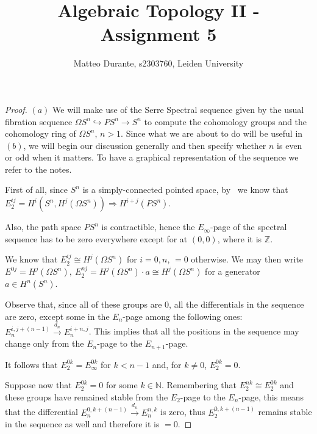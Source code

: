 \documentclass{article}
\newcommand{\numberset}{\mathbb}
\newcommand{\N}{\numberset{N}}
\newcommand{\Z}{\numberset{Z}}
\newcommand{\exercise}[1]{\noindent {\bf Exercise #1}}
\begin{document}
\title{Algebraic Topology II - Assignment 5}

\author{Matteo Durante, s2303760, Leiden University}

\maketitle

\exercise{2}

\begin{proof}
    $(a)$ We will make use of the Serre Spectral sequence given by the usual
    fibration sequence $\Omega S^n\hookrightarrow PS^n\rightarrow S^n$ to
    compute the cohomology groups and the cohomology ring of $\Omega S^n$,
    $n>1$. Since what we are about to do will be useful in $(b)$, we will begin
    our discussion generally and then specify whether $n$ is even or odd when it
    matters. To have a graphical representation of the sequence we refer to the
    notes.

    First of all, since $S^n$ is a simply-connected pointed space, by~\cite[thm.
    9.5]{HM19} we know that $E^{ij}_2=H^i(S^n,H^j(\Omega S^n))\Rightarrow
    H^{i+j}(PS^n)$.

    Also, the path space $PS^n$ is contractible, hence the $E_\infty$-page of
    the spectral sequence has to be zero everywhere except for at $(0,0)$, where
    it is $\Z$.

    We know that $E^{ij}_2\cong H^j(\Omega S^n)$ for $i=0,n$, $=0$ otherwise. We
    may then write $E^{0j}=H^j(\Omega S^n),\ E^{nj}_2=H^j(\Omega S^n)\cdot
    a\cong H^j(\Omega S^n)$ for a generator $a\in H^n(S^n)$.

    Observe that, since all of these groups are 0, all the differentials in the
    sequence are zero, except some in the $E_n$-page among the following ones:
    $E^{i,j+(n-1)}_n\xrightarrow{d_n}E^{i+n,j}_n$. This implies that all the
    positions in the sequence may change only from the $E_n$-page to the
    $E_{n+1}$-page.

    It follows that $E^{0k}_2=E^{0k}_\infty$ for $k<n-1$ and, for $k\neq 0$,
    $E^{0k}_2=0$.

    Suppose now that $E^{0k}_2=0$ for some $k\in\N$. Remembering that
    $E^{nk}_2\cong E^{0k}_2$ and these groups have remained stable from the
    $E_2$-page to the $E_n$-page, this means that the differential
    $E^{0,k+(n-1)}_n\xrightarrow{d_n} E^{n,k}_n$ is zero, thus $E^{0,k+(n-1)}_2$
    remains stable in the sequence as well and therefore it is $=0$.


\end{proof}
\end{document}
